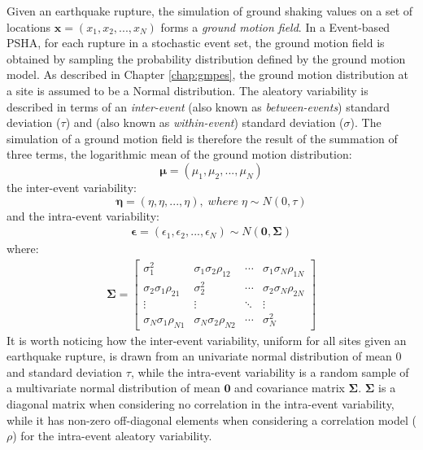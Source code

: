Given an earthquake rupture, the simulation of ground shaking values on a set of locations $\bm{x}=(x_{1}, x_{2}, ..., x_{N})$
forms a \textit{ground motion field}. In a Event-based PSHA, for each rupture in a stochastic event set,
the ground motion field is obtained by sampling the probability distribution defined by the ground motion model.
As described in Chapter \ref{chap:gmpes}, the ground motion distribution at a site is assumed to be a Normal
distribution. The aleatory variability is described in terms of an \textit{inter-event} (also known as \textit{between-events})
standard deviation ($\tau$) and  (also known as \textit{within-event}) standard deviation ($\sigma$).
The simulation of a ground motion field is therefore the result of the summation of three terms, the logarithmic mean of the
ground motion distribution:
\begin{equation}
\bm\mu = (\mu_{1}, \mu_{2}, ..., \mu_{N})
\end{equation}
the inter-event variability:
\begin{equation}
\bm\eta = (\eta, \eta, ..., \eta),\;where\;\eta\sim N(0, \tau)
\end{equation}
and the intra-event variability:
\begin{align}
\bm\epsilon = (\epsilon_{1}, \epsilon_{2}, ..., \epsilon_{N}) \sim N(\bm{0}, \bm\Sigma)
\end{align}
where:
\begin{align}
\bm\Sigma = 
\begin{bmatrix}
\sigma_{1}^2&\sigma_{1}\sigma_{2}\rho_{12}&\cdots &\sigma_{1}\sigma_{N}\rho_{1N} \\
\sigma_{2}\sigma_{1}\rho_{21}&\sigma_{2}^2&\cdots &\sigma_{2}\sigma_{N}\rho_{2N} \\
\vdots & \vdots & \ddots & \vdots\\
\sigma_{N}\sigma_{1}\rho_{N1}&\sigma_{N}\sigma_{2}\rho_{N2}&\cdots &\sigma_{N}^2
\end{bmatrix}
\end{align}
%
It is worth noticing how the inter-event variability, uniform for all sites
given an earthquake rupture, is drawn from an univariate normal distribution of
mean 0 and standard deviation $\tau$, while the intra-event variability is a
random sample of a multivariate normal distribution of mean $\bm{0}$ and
covariance matrix $\bm\Sigma$.  $\bm\Sigma$ is a diagonal matrix when
considering no correlation in the intra-event variability, while it has non-zero
off-diagonal elements when considering a correlation model ($\rho$) for the
intra-event aleatory variability.

